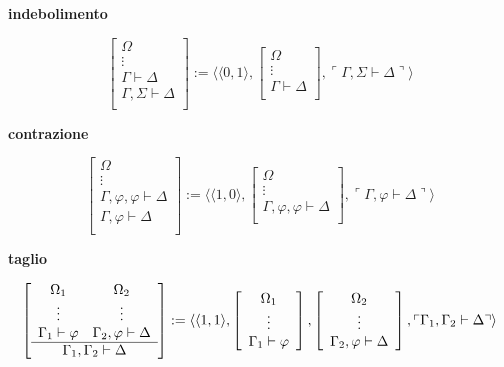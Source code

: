 \vspace{0.5cm}

\textbf{indebolimento}

$$
\left [
\begin{array}{c}
\Omega\\
\vdots\\
\Gamma \vdash \Delta\\
\hline
\Gamma, \Sigma \vdash \Delta\\
\end{array}
\right ]
:= \langle \langle 0, 1 \rangle ,
\left [
\begin{array}{c}
\Omega\\
\vdots\\
\Gamma \vdash \Delta\\
\end{array}
\right ],
\ulcorner \Gamma, \Sigma \vdash \Delta \urcorner \rangle
$$

\vspace{0.5cm}

\textbf{contrazione}

$$
\left [
\begin{array}{c}
\Omega\\
\vdots\\
\Gamma, \varphi, \varphi \vdash \Delta\\
\hline
\Gamma, \varphi \vdash \Delta\\
\end{array}
\right ]
:= \langle \langle 1, 0 \rangle ,
\left [
\begin{array}{c}
\Omega\\
\vdots\\
\Gamma, \varphi, \varphi \vdash \Delta\\
\end{array}
\right ],
\ulcorner \Gamma, \varphi \vdash \Delta \urcorner \rangle
$$

\vspace{0,5cm}

\textbf{taglio}

$$
\left [
\begin{array}{cc}
\Omega_1 & \Omega_2 \\
\vdots & \vdots\\
\Gamma_1 \vdash \varphi & \Gamma_2, \varphi \vdash \Delta\\
\hline
\multicolumn{2}{c}{\Gamma_1, \Gamma_2 \vdash \Delta}\\
\end{array}
\right ]
:= \langle \langle 1, 1 \rangle ,
\left [
\begin{array}{c}
\Omega_1\\
\vdots\\
\Gamma_1 \vdash \varphi\\
\end{array}
\right ],
\left [
\begin{array}{c}
\Omega_2\\
\vdots\\
\Gamma_2, \varphi \vdash \Delta\\
\end{array}
\right],
\ulcorner \Gamma_1, \Gamma_2 \vdash \Delta \urcorner \rangle
$$



